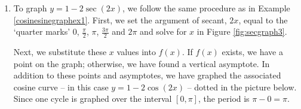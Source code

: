{
\begin{enumerate}

\item  To graph $y = 1 - 2 \sec(2x)$, we follow the same procedure as in Example \ref{cosinesinegraphex1}.  First, we set the argument of secant, $2x$, equal to the `quarter marks' $0$, $\frac{\pi}{2}$, $\pi$, $\frac{3\pi}{2}$ and $2\pi$ and solve for $x$ in Figure \ref{fig:secgraph3}.


Next, we substitute these $x$ values into $f(x)$.  If $f(x)$ exists, we have a point on the graph;  otherwise, we have found a vertical asymptote.  In addition to these points and asymptotes, we have graphed the associated cosine curve -- in this case $y = 1 - 2 \cos(2x)$ -- dotted in the picture below.  Since one cycle is graphed over the interval $[0,\pi]$, the period is $\pi - 0 = \pi$.
 
\medskip


\end{enumerate}}
